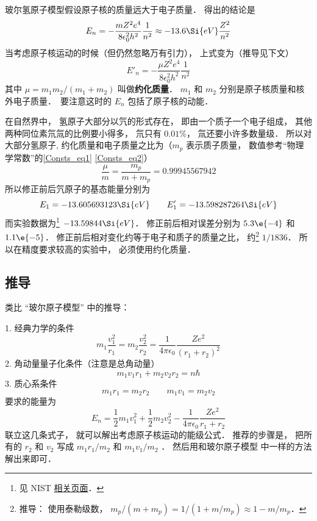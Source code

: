 
玻尔氢原子模型假设原子核的质量远大于电子质量． 得出的结论是
\begin{equation}
E_n = -\frac{mZ^2 e^4}{8\epsilon_0^2 h^2}\frac{1}{n^2} \approx  - 13.6\Si{eV} \frac{Z^2}{n^2}
\end{equation}
当考虑原子核运动的时候（但仍然忽略万有引力）， 上式变为（推导见下文）
\begin{equation}\label{HRMass_eq1}
E'_n = -\frac{\mu Z^2 e^4}{8\epsilon_0^2 h^2} \frac{1}{n^2}
\end{equation}
其中 $\mu  = m_1 m_2/(m_1 + m_2)$ 叫做\textbf{约化质量}． $m_1$ 和 $m_2$ 分别是原子核质量和核外电子质量．　要注意这时的 $E_n$ 包括了原子核的动能．

在自然界中， 氢原子大部分以氕的形式存在， 即由一个质子一个电子组成， 其他两种同位素氘氚的比例要小得多， 氘只有 $0.01\%$， 氚还要小许多数量级． 所以对大部分氢原子, 约化质量和电子质量之比为（$m_p$ 表示质子质量， 数值参考“物理学常数”的\autoref{Consts_eq1} \autoref{Consts_eq2}）
\begin{equation}
\frac{\mu}{m} = \frac{m_p}{m + m_p} = 0.99945567942
\end{equation}
所以修正前后氕原子的基态能量分别为
\begin{equation}
E_1 = -13.605693123\Si{eV} \qquad 
E'_1 = -13.598287264\Si{eV}
\end{equation}
而实验数据为\footnote{见 NIST \href{https://webbook.nist.gov/cgi/cbook.cgi?ID=C12385136&Mask=20}{相关页面}．} $-13.59844\Si{eV}$． 修正前后相对误差分别为 $5.3\e{-4}$ 和 $1.1\e{-5}$． 修正前后相对变化约等于电子和质子的质量之比， 约\footnote{推导： 使用泰勒级数， $m_p/(m + m_p) = 1/(1 + m/m_p) \approx 1 - m/m_p$．} $1/1836$． 所以在精度要求较高的实验中， 必须使用约化质量．

\subsection{推导}
类比 “玻尔原子模型” 中的推导：

1. 经典力学的条件
\begin{equation}
m_1 \frac{v_1^2}{r_1} = m_2 \frac{v_2^2}{r_2} = \frac{1}{4\pi\epsilon_0} \frac{Z e^2}{(r_1 + r_2)^2}
\end{equation}
2. 角动量量子化条件（注意是总角动量）
\begin{equation}
m_1 v_1 r_1 + m_2 v_2 r_2 = n\hbar 
\end{equation}
3. 质心系条件
\begin{equation}
m_1 r_1 = m_2 r_2 \qquad m_1 v_1 = m_2 v_2
\end{equation}
要求的能量为
\begin{equation}
E_n = \frac12 m_1 v_1^2 + \frac12 m_2 v_2^2 - \frac{1}{4\pi\epsilon_0} \frac{Z e^2}{r_1 + r_2}
\end{equation}
联立这几条式子， 就可以解出考虑原子核运动的能级公式． 推荐的步骤是， 把所有的 $r_2$ 和 $v_2$ 写成 $m_1 r_1/m_2$ 和 $m_1 v_1/m_2$ ． 然后用和玻尔原子模型%
中一样的方法解出来即可．
